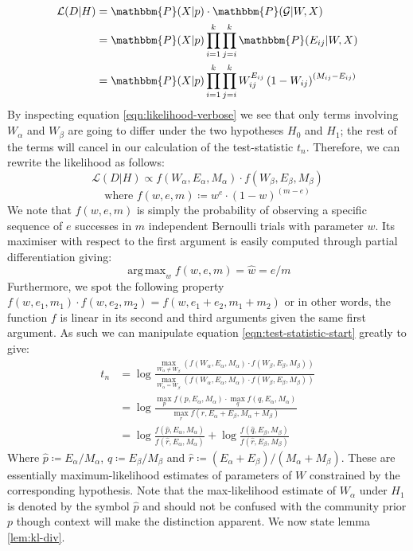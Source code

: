 \documentclass[11pt]{article}
\DeclareMathOperator*{\argmax}{arg\,max}
\newcommand{\Gcal}{\mathcal{G}}
\newcommand{\lik}{\mathcal{L}}
\newcommand{\prob}{\mathbbm{P}}
\begin{document}
\begin{multicols*}{2}
%
\begin{align}
\lik(D | H) &= \prob(X| p) \cdot \prob(\Gcal | W, X) \nonumber \\
&= \prob(X | p) \prod_{i=1}^{k} \prod_{j=i}^{k} \prob(E_{ij} | W, X) \nonumber \\
&= \prob(X | p) \prod_{i=1}^{k} \prod_{j=i}^{k} W_{ij} ^ {E_{ij}} \left( 1 - W_{ij} \right) ^ {(M_{ij} - E_{ij})}
\label{eqn:likelihood-verbose}
\end{align}
%
By inspecting equation \ref{eqn:likelihood-verbose} we see that only terms involving $W_{\alpha}$ and $W_{\beta}$ are going to differ under the two hypotheses $H_0$ and $H_1$; the rest of the terms will cancel in our calculation of the test-statistic $t_n$. Therefore, we can rewrite the likelihood as follows:
%
\begin{equation}
	\lik (D | H) \propto f (W_\alpha, E_\alpha, M_\alpha) \cdot f (W_\beta, E_\beta, M_\beta)
\end{equation} 
\begin{equation}
	\textrm{where } f (w, e, m) \coloneqq w^e \cdot (1-w)^{(m - e)}
	\label{eqn:f-defn}
\end{equation}
%
We note that $f(w, e, m)$ is simply the probability of observing a specific sequence of $e$ successes in $m$ independent Bernoulli trials with parameter $w$. Its maximiser with respect to the first argument is easily computed through partial differentiation giving:
%
\begin{equation}
	\argmax_w f(w, e, m) = \hat{w} = e / m
	\label{eqn:f-maximiser}
\end{equation}
%
Furthermore, we spot the following property $f(w, e_1, m_1) \cdot f(w, e_2, m_2) = f(w, e_1 + e_2, m_1 + m_2)$ or in other words, the function $f$ is linear in its second and third arguments given the same first argument. As such we can manipulate equation \ref{eqn:test-statistic-start} greatly to give:
%
\begin{align}
	t_n &= \log \frac
	{
		\max_{W_{\alpha} \neq W_{\beta}}(f (W_\alpha, E_\alpha, M_\alpha) \cdot f (W_\beta, E_\beta, M_\beta))
	}
	{
		\max_{W_\alpha = W_\beta} (f (W_\alpha, E_\alpha, M_\alpha) \cdot f (W_\beta, E_\beta, M_\beta))
	} \nonumber \\
	&= \log \frac{
		\max_p f(p, E_\alpha, M_\alpha) \cdot \max_q f(q, E_\alpha, M_\alpha)
	}{
		\max_r f(r, E_\alpha + E_\beta, M_\alpha + M_\beta)
	} \nonumber \\
	&= \log \frac{f(\hat{p}, E_\alpha, M_\alpha)}{f(\hat{r}, E_\alpha, M_\alpha)} + \log \frac{f(\hat{q}, E_\beta, M_\beta)}{f(\hat{r}, E_\beta, M_\beta)}
\end{align}
%
Where $\hat{p} \coloneqq E_\alpha / M_\alpha$, $\hat{q} \coloneqq E_\beta / M_\beta$ and $\hat{r} \coloneqq (E_\alpha + E_\beta) / (M_\alpha + M_\beta)$. These are essentially maximum-likelihood estimates of parameters of $W$ constrained by the corresponding hypothesis. Note that the max-likelihood estimate of $W_\alpha$ under $H_1$ is denoted by the symbol $\hat{p}$ and should not be confused with the community prior $p$ though context will make the distinction apparent. We now state lemma \ref{lem:kl-div}.


\end{multicols*}
\end{document}
